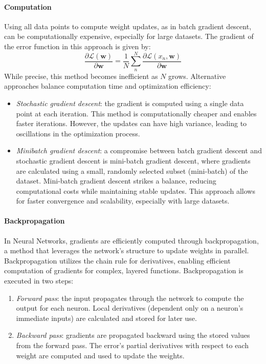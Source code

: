 \paragraph*{Computation}
Using all data points to compute weight updates, as in batch gradient descent, can be computationally expensive, especially for large datasets. 
The gradient of the error function in this approach is given by:
\[\dfrac{\partial \mathcal{L}(\mathbf{w})}{\partial \mathbf{w}}=\dfrac{1}{N}\sum_n^N\dfrac{\partial \mathcal{L}(x_n,\mathbf{w})}{\partial\mathbf{w}}\]
While precise, this method becomes inefficient as $N$ grows. 
Alternative approaches balance computation time and optimization efficiency:
\begin{itemize}
    \item \textit{Stochastic gradient descent}: the gradient is computed using a single data point at each iteration. 
        This method is computationally cheaper and enables faster iterations. 
        However, the updates can have high variance, leading to oscillations in the optimization process.
    \item \textit{Minibatch gradient descent}: a compromise between batch gradient descent and stochastic gradient descent is mini-batch gradient descent, where gradients are calculated using a small, randomly selected subset (mini-batch) of the dataset. 
        Mini-batch gradient descent strikes a balance, reducing computational costs while maintaining stable updates. 
        This approach allows for faster convergence and scalability, especially with large datasets.
\end{itemize}

\paragraph*{Backpropagation}
In Neural Networks, gradients are efficiently computed through backpropagation, a method that leverages the network's structure to update weights in parallel. 
Backpropagation utilizes the chain rule for derivatives, enabling efficient computation of gradients for complex, layered functions.
\noindent Backpropagation is executed in two steps:
\begin{enumerate}
    \item \textit{Forward pass}: the input propagates through the network to compute the output for each neuron.
        Local derivatives (dependent only on a neuron's immediate inputs) are calculated and stored for later use.
    \item \textit{Backward pass}: gradients are propagated backward using the stored values from the forward pass.
        The error's partial derivatives with respect to each weight are computed and used to update the weights.
\end{enumerate}

